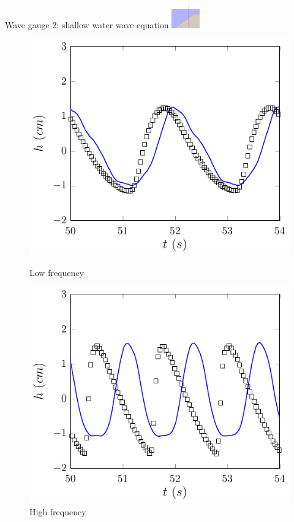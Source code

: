 \documentclass[pdf]{beamer}
\begin{document}
\begin{frame}{Wave gauge 2: shallow water wave equation \space\space	\includegraphics[width=1.2cm]{./Pics/WT2z.pdf}  }
	\begin{figure}
		\centering
		\begin{minipage}{.5\textwidth}
			\centering
			\includegraphics[width=0.9\linewidth]{./Pics/SL/WG2/1SWW-figure0.pdf}
			\caption{Low frequency}
		\end{minipage}%
		\begin{minipage}{.5\textwidth}
			\centering
			\includegraphics[width=0.9\linewidth]{./Pics/SH/WG2/1SWW-figure0.pdf}
			\caption{High frequency}
		\end{minipage}
	\end{figure}
\end{frame}
\end{document}
